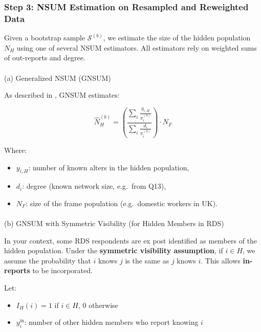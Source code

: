 \documentclass[
  12pt,
  letterpaper,
  DIV=11,
  numbers=noendperiod]{scrartcl}
\makeatletter
\let\oldparagraph\paragraph
\renewcommand{\paragraph}{
    \@ifstar
      \xxxParagraphStar
      \xxxParagraphNoStar
  }
\newcommand{\xxxParagraphStar}[1]{\oldparagraph*{#1}\mbox{}}
\newcommand{\xxxParagraphNoStar}[1]{\oldparagraph{#1}\mbox{}}
\theoremstyle{plain}
\theoremstyle{definition}
\makeatother
\begin{document}
\subsubsection{Step 3: NSUM Estimation on Resampled and Reweighted
Data}\label{step-3-nsum-estimation-on-resampled-and-reweighted-data}

Given a bootstrap sample \(\mathcal{S}^{(b)}\), we estimate the size of
the hidden population \(N_H\) using one of several NSUM estimators. All
estimators rely on weighted sums of out-reports and degree.

\paragraph{(a) Generalized NSUM (GNSUM)}\label{a-generalized-nsum-gnsum}

As described in \textcite{feeh16-generaling}, GNSUM estimates:

\[\hat{N}_H^{(b)} = \left( \frac{\sum_{i} \frac{y_{i,H}}{\pi_i^{(b)}}}{\sum_{i} \frac{d_i}{\pi_i^{(b)}}} \right) \cdot N_F\]

Where:

\begin{itemize}
\item
  \(y_{i,H}\): number of known alters in the hidden population,
\item
  \(d_i\): degree (known network size, e.g.~from Q13),
\item
  \(N_F\): size of the frame population (e.g.~domestic workers in UK).
\end{itemize}

\paragraph{(b) GNSUM with Symmetric Visibility (for Hidden Members in
RDS)}\label{b-gnsum-with-symmetric-visibility-for-hidden-members-in-rds}

In your context, some RDS respondents are ex post identified as members
of the hidden population. Under the \textbf{symmetric visibility
assumption}, if \(i \in H\), we assume the probability that \(i\) knows
\(j\) is the same as \(j\) knows \(i\). This allows \textbf{in-reports}
to be incorporated.

Let:

\begin{itemize}
\item
  \(I_H(i) = 1\) if \(i \in H\), 0 otherwise
\item
  \(y_{i}^{\text{in}}\): number of other hidden members who report
  knowing \(i\)
\end{itemize}
\end{document}
